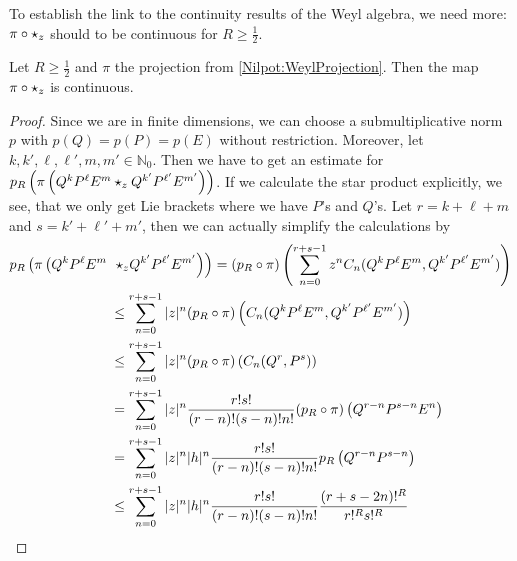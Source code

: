 To establish the link to the continuity results of the Weyl algebra,
we need more: $\pi \circ \star_z$ should to be continuous for $R \geq \frac 
1 2$.
\begin{proposition}
    \label{proposition:ContinuousProductInWeyl}%
    Let $R \geq \frac{1}{2}$ and $\pi$ the projection from
    \eqref{Nilpot:WeylProjection}. Then the map $\pi \circ
    \star_z$ is continuous.
\end{proposition}
\begin{proof}
    Since we are in finite dimensions, we can choose a
    submultiplicative norm $p$ with $p(Q) = p(P) = p(E)$ without
    restriction. Moreover, let $k, k', \ell, \ell', m, m' \in
    \mathbb{N}_0$. Then we have to get an estimate for $p_R \left(
        \pi\left( Q^k P^{\ell} E^m \star_z Q^{k'} P^{\ell'} E^{m'}
        \right) \right)$.  If we calculate the star product
    explicitly, we see, that we only get Lie brackets where we have
    $P$'s and $Q$'s. Let $r = k + \ell + m$ and $s = k' + \ell' + m'$,
    then we can actually simplify the calculations by
    \begin{align*}
        p_R \left(
         	\pi\left( 
         		Q^k P^{\ell} E^m
         		\right.
         	\right.
        &
         	\left.
         		\left.
         		\ostar_z
         		Q^{k'} P^{\ell'} E^{m'}
         	\right)
        \right)
        =
        (p_R \circ \pi) \left(
        \sum\limits_{n=0}^{r + s - 1}
        z^n C_n(Q^k P^{\ell} E^m,
        Q^{k'} P^{\ell'} E^{m'})
        \right)
        \\
        & \leq
        \sum\limits_{n=0}^{r + s - 1}
        |z|^n
        (p_R \circ \pi) \left(
        C_n(Q^k P^{\ell} E^m,
        Q^{k'} P^{\ell'} E^{m'})
        \right)
        \\
        & \leq
        \sum\limits_{n=0}^{r + s - 1}
        |z|^n
        (p_R \circ \pi) \left(
        C_n(Q^r, P^s)
        \right)
        \\
        & =
        \sum\limits_{n=0}^{r + s - 1}
        |z|^n
        \frac{r! s!}{(r-n)! (s-n)! n!}
        (p_R \circ \pi) \left(
        Q^{r-n} P^{s-n} E^n
        \right)
        \\
        & =
        \sum\limits_{n=0}^{r + s - 1}
        |z|^n |h|^n
        \frac{r! s!}{(r-n)! (s-n)! n!}
        p_R \left(
        Q^{r-n} P^{s-n}
        \right)
        \\
        & \leq
        \sum\limits_{n=0}^{r + s - 1}
        |z|^n |h|^n
        \frac{r! s!}{(r-n)! (s-n)! n!}
        \frac{(r + s - 2n)!^R}{r!^R s!^R}

\end{align*}
\end{proof}
